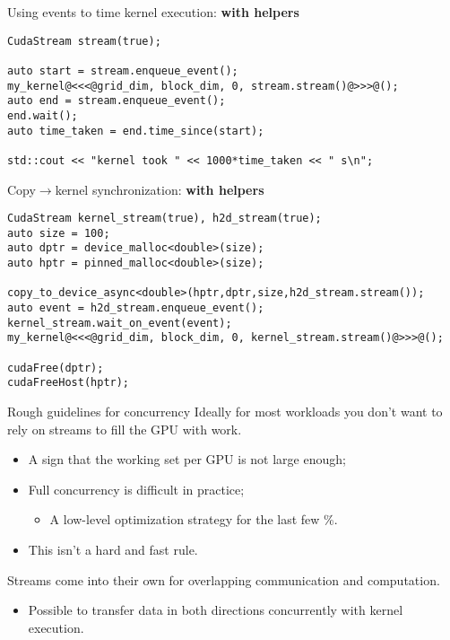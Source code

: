 \documentclass[aspectratio=43]{beamer}
\begin{document}
\begin{frame}[fragile]{}
    \begin{code}{Using events to time kernel execution: \textbf{with helpers}}
        \begin{lstlisting}[style=boxcudatiny]
CudaStream stream(true);

auto start = stream.enqueue_event();
my_kernel@<<<@grid_dim, block_dim, 0, stream.stream()@>>>@();
auto end = stream.enqueue_event();
end.wait();
auto time_taken = end.time_since(start);

std::cout << "kernel took " << 1000*time_taken << " s\n";
        \end{lstlisting}
    \end{code}
    \begin{code}{Copy$\rightarrow$kernel synchronization: \textbf{with helpers}}
        \begin{lstlisting}[style=boxcudatiny]
CudaStream kernel_stream(true), h2d_stream(true);
auto size = 100;
auto dptr = device_malloc<double>(size);
auto hptr = pinned_malloc<double>(size);

copy_to_device_async<double>(hptr,dptr,size,h2d_stream.stream());
auto event = h2d_stream.enqueue_event();
kernel_stream.wait_on_event(event);
my_kernel@<<<@grid_dim, block_dim, 0, kernel_stream.stream()@>>>@();

cudaFree(dptr);
cudaFreeHost(hptr);
        \end{lstlisting}
    \end{code}
\end{frame}

\begin{frame}[fragile]{Rough guidelines for concurrency}
    Ideally for most workloads you don't want to rely on streams to fill the GPU with work.
    \begin{itemize}
        \item A sign that the working set per GPU is not large enough;
        \item Full concurrency is difficult in practice;
        \begin{itemize}
            \item A low-level optimization strategy for the last few \%.
        \end{itemize}
        \item This isn't a hard and fast rule.
    \end{itemize}

    Streams come into their own for overlapping communication and computation.
    \begin{itemize}
        \item Possible to transfer data in both directions concurrently with kernel execution.
    \end{itemize}
\end{frame}

\end{document}
